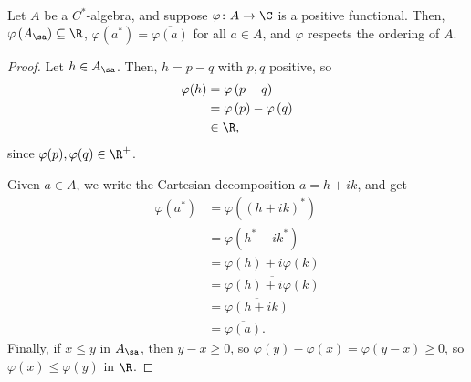 \documentclass[10pt]{mypackage}
\begin{document}
\begin{fact}
  Let $A$ be a $C^{\ast}$-algebra, and suppose $\varphi\colon A\rightarrow \C$ is a positive functional. Then, $\varphi\left(A_{\sa}\right)\subseteq \R$, $\varphi\left(a^{\ast}\right) = \overline{\varphi\left(a\right)}$ for all $a\in A$, and $\varphi$ respects the ordering of $A$.
\end{fact}
\begin{proof}
  Let $h\in A_{\sa}$. Then, $h = p-q$ with $p,q$ positive, so
  \begin{align*}
    \varphi(h) &= \varphi\left(p-q\right)\\
               &= \varphi\left(p\right) - \varphi\left(q\right)\\
               &\in \R,
  \end{align*}
  since $\varphi(p),\varphi(q)\in \R^{+}$.\newline

  Given $a\in A$, we write the Cartesian decomposition $a = h + ik$, and get
  \begin{align*}
    \varphi\left(a^{\ast}\right) &= \varphi\left(\left(h + ik\right)^{\ast}\right)\\
                                 &= \varphi\left(h^{\ast} - ik^{\ast}\right)\\
                                 &= \varphi\left(h\right) + i\varphi\left(k\right)\\
                                 &= \overline{\varphi\left(h\right) + i\varphi\left(k\right)}\\
                                 &= \overline{\varphi\left(h + ik\right)}\\
                                 &= \overline{\varphi\left(a\right)}.
  \end{align*}
  Finally, if $x\leq y$ in $A_{\sa}$, then $y-x \geq 0$, so $\varphi\left(y\right) - \varphi\left(x\right) = \varphi\left(y-x\right) \geq 0$, so $\varphi\left(x\right)\leq \varphi\left(y\right)$ in $\R$.
\end{proof}
\end{document}
